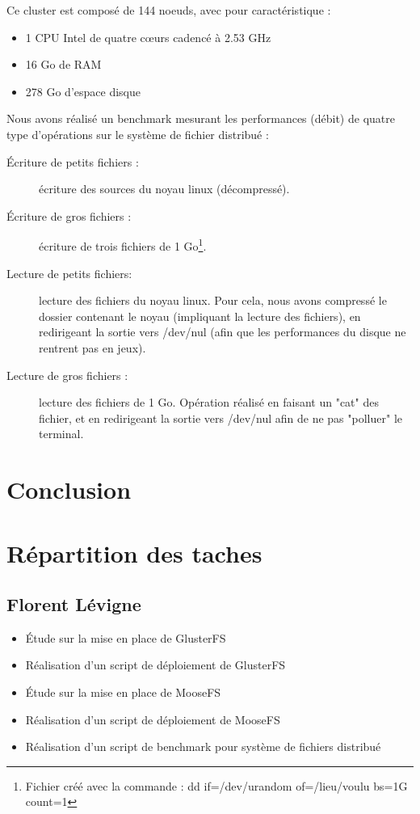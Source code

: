 \documentclass[12pt]{report}
\begin{document}
			Ce cluster est composé de 144 noeuds, avec pour caractéristique :
			\begin{itemize}
				\item 1 CPU Intel de quatre cœurs cadencé à 2.53 GHz
				\item 16 Go de RAM
				\item 278 Go d'espace disque\\
			\end{itemize}

			Nous avons réalisé un benchmark mesurant les performances (débit) de quatre type d'opérations sur le système de fichier distribué :
			\begin{description}
				\item[Écriture de petits fichiers :] écriture des sources du noyau linux (décompressé).
				\item[Écriture de gros fichiers :] écriture de trois fichiers de 1 Go\footnote{Fichier créé avec la commande : dd if=/dev/urandom of=/lieu/voulu bs=1G count=1}.
				\item[Lecture de petits fichiers: ] lecture des fichiers du noyau linux.
				Pour cela, nous avons compressé le dossier contenant le noyau (impliquant la lecture des fichiers),
				en redirigeant la sortie vers /dev/nul (afin que les performances du disque ne rentrent pas en jeux).
				\item[Lecture de gros fichiers :] lecture des fichiers de 1 Go. Opération réalisé en faisant un "cat" des fichier,
				et en redirigeant la sortie vers /dev/nul afin de ne pas "polluer" le terminal.
			\end{description}


	\chapter{Conclusion}

	\appendix
		\chapter{Répartition des taches}
			\section{Florent Lévigne}
				\begin{itemize}
					\item Étude sur la mise en place de GlusterFS
					\item Réalisation d'un script de déploiement de GlusterFS
					\item Étude sur la mise en place de MooseFS
					\item Réalisation d'un script de déploiement de MooseFS
					\item Réalisation d'un script de benchmark pour système de fichiers distribué
				\end{itemize}
\end{document}

